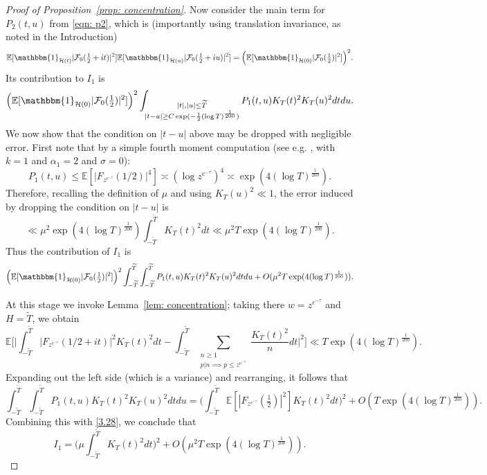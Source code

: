 \documentclass[12pt, notitlepage]{amsart}
\numberwithin{equation}{section}
\def\E{\mathbb E}
\def\TT{\widetilde{T}}
\theoremstyle{remark}
\theoremstyle{definition}
\theoremstyle{remark}
\numberwithin{equation}{section}
\begin{document}
\begin{proof}[Proof of Proposition~\ref{prop: concentration}]
 Now consider the main term for $P_2(t,u)$ from \eqref{eqn: p2}, which is (importantly using translation invariance, as noted in the Introduction) 
 $$ 
 \E[\mathbbm{1}_{\mathcal{H}(t)} |{\mathcal F}_0(\tfrac 12+it)|^2 ]\E[ \mathbbm{1}_{\mathcal{H}(u)} |{\mathcal F}_0(\tfrac 12+iu)|^2] = 
 \Big( \E[ \mathbbm{1}_{\mathcal{H}(0)} |{\mathcal F}_0(\tfrac 12)|^2 ]\Big)^2. 
 $$ 
  Its contribution to $I_1$ is 
  $$ 
   \Big( \E[ \mathbbm{1}_{\mathcal{H}(0)} |{\mathcal F}_0(\tfrac 12)|^2 ]\Big)^2 \int_{\substack{|t|, |u| \le \TT \\ |t-u|  \ge C\exp(-\frac 12 (\log T)^{\frac 1{200}})}}  P_1(t,u) K_T(t)^2 K_T(u)^2 dt du. 
   $$ 
 We now show that the condition on $|t-u|$ above may be dropped with negligible error.   First note that by a simple fourth moment computation (see e.g. \cite[Euler Product Result 1]{Harperlargevalue}, with $k=1$ and $\alpha_1 = 2$ and $\sigma = 0$):
\begin{equation}\label{eqn: small}
P_1(t, u) \leq \E[|F_{z^{e^{-\tau}}}(1/2)|^{4}] \asymp (\log z^{e^{-\tau}})^{4} \asymp \exp( 4 (\log T)^{\frac 1{200}}).   
\end{equation}
Therefore, recalling the definition of $\mu$ and using $K_T(u)^2 \ll 1$, the error induced by dropping the condition on $|t-u|$ is 
$$ 
\ll \mu^2 \exp(4(\log T)^{\frac 1{200}}) \int_{-\TT}^{\TT} K_T(t)^2 dt \ll \mu^2 T \exp(4(\log T)^{\frac 1{200}}). 
$$ 
Thus the contribution of $I_1$ is
\begin{equation} 
\label{3.28} 
 \Big( \E[ \mathbbm{1}_{\mathcal{H}(0)} |{\mathcal F}_0(\tfrac 12)|^2 ]\Big)^2 \int_{-\TT}^{\TT}\int_{-\TT}^{\TT} P_1(t,u) K_T(t)^2 K_T(u)^2 dt du +O(\mu^2 T\exp(4(\log T)^{\frac{1}{200}})). 
 \end{equation} 
 
 At this stage we invoke  Lemma~\ref{lem: concentration}; taking there $w=z^{e^{-\tau}}$ and $H=\TT$, we obtain
\[ 
\E\Big[\Big| \int_{-\TT}^{\TT}  |F_{z^{e^{-\tau}}}(1/2+it)|^{2}  K_T(t)^{2}dt  - \int_{-\TT}^{\TT} \sum_{\substack{n \geq 1 \\ p|n \implies p\le  z^{e^{-\tau}}}} \frac{K_T(t)^{2}}{n}  dt      \Big|^{2}\Big]
\ll T\exp(4 (\log T)^{\frac 1{200}}). 
\]
 Expanding out the left side (which is a variance) and rearranging, it follows that 
 $$
 \int_{-\TT}^{\TT}\int_{-\TT}^{\TT} P_1(t,u) K_T(t)^2 K_T(u)^2 dt du\! = \!\Big( \int_{-\TT}^{\TT} \E[|F_{z^{e^{-\tau}}}(\tfrac 12)|^2] K_T(t)^2 dt \Big)^2 + O(T\exp(4 (\log T)^{\frac 1{200}})). 
 $$ 
  Combining this with \eqref{3.28}, we conclude that 
  \begin{equation} 
  \label{3.29} 
  I_1 = \Big( \mu \int_{-\TT}^{\TT} K_T(t)^2 dt \Big)^2 + O(\mu^2 T \exp(4 (\log T)^{\frac 1{200}})).
  \end{equation} 
  

\end{proof}
\end{document}
